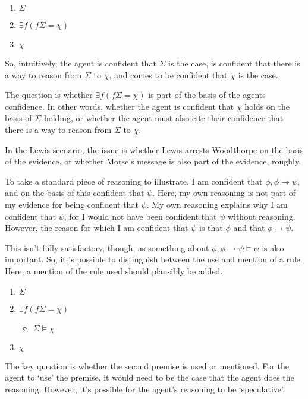 \documentclass[10pt]{article}
\begin{document}
\begin{enumerate}
\item \(\Sigma\)
\item \(\exists f(f\Sigma = \chi)\)
\item \(\chi\)
\end{enumerate}

So, intuitively, the agent is confident that \(\Sigma\) is the case, is confident that there is a way to reason from \(\Sigma\) to \(\chi\), and comes to be confident that \(\chi\) is the case.

The question is whether \(\exists f(f\Sigma = \chi)\) is part of the basis of the agents confidence.
In other words, whether the agent is confident that \(\chi\) holds on the basis of \(\Sigma\) holding, or whether the agent must also cite their confidence that there is a way to reason from \(\Sigma\) to \(\chi\).

In the Lewis scenario, the issue is whether Lewis arrests Woodthorpe on the basis of the evidence, or whether Morse's message is also part of the evidence, roughly.

To take a standard piece of reasoning to illustrate.
I am confident that \(\phi, \phi \rightarrow \psi\), and on the basis of this confident that \(\psi\).
Here, my own reasoning is not part of my evidence for being confident that \(\psi\).
My own reasoning explains why I am confident that \(\psi\), for I would not have been confident that \(\psi\) without reasoning.
However, the reason for which I am confident that \(\psi\) is that \(\phi\) and that \(\phi \rightarrow \psi\).

This isn't fully satisfactory, though, as something about \(\phi, \phi \rightarrow \psi \vDash \psi\) is also important.
So, it is possible to distinguish between the use and mention of a rule.
Here, a mention of the rule used should plausibly be added.

\begin{enumerate}
\item \(\Sigma\)
\item \(\exists f(f\Sigma = \chi)\)
  \begin{itemize}
  \item \(\Sigma \vDash \chi\)
  \end{itemize}
\item \(\chi\)
\end{enumerate}

The key question is whether the second premise is used or mentioned.
For the agent to `use' the premise, it would need to be the case that the agent does the reasoning.
However, it's possible for the agent's reasoning to be `speculative'.
\end{document}

